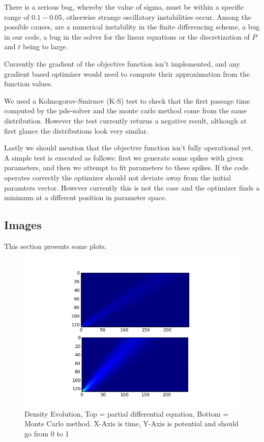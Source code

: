 \documentclass[10pt]{article}
\begin{document}
There is a serious bug, whereby the value of sigma,
must be within a specific range of $0.1 - 0.05$, otherwise strange
oscillatory instabilities occur. Among the possible causes, are a
numerical instability in the finite differencing scheme, a bug in our
code, a bug in the solver for the linear equations or the
discretization of $P$ and $t$ being to large. 

Currently the gradient of the objective function isn't implemented,
and any gradient based optimizer would need to compute their
approximation from the function values. 

We used a Kolmogorov-Smirnov (K-S) test to check that the first
passage time computed by the pde-solver and the monte carlo method
come from the same distribution. However the test currently returns a
negative result, although at first glance the distributions look very
similar. 

Lastly we should mention that the objective function isn't fully
operational yet. A simple test is executed as follows: first we
generate some spikes with given parameters, and then we attempt to fit
parameters to these spikes. If the code operates correctly the
optimizer should not deviate away from the initial paramters vector.
However currently this is not the case and the optimizer finds a
minimum at a different position in parameter space.

\subsection{Images}

This section presents some plots.

\begin{figure}[htp]
\centering
\includegraphics[scale=0.75]{P_vt}
\caption{Density Evolution, Top = partial differential equation,
Bottom = Monte Carlo method. X-Axis is time, Y-Axis is potential and
should go from 0 to 1}
\end{figure}
\end{document}
